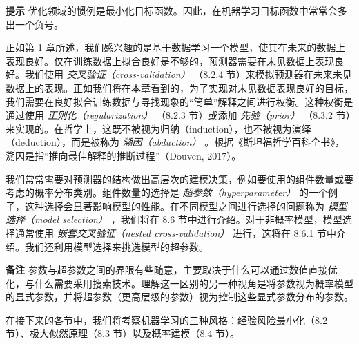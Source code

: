\begin{notebox}
\textbf{提示} 优化领域的惯例是最小化目标函数。因此，在机器学习目标函数中常常会多出一个负号。
\end{notebox}

正如第 1 章所述，我们感兴趣的是基于数据学习一个模型，使其在未来的数据上表现良好。仅在训练数据上拟合良好是不够的，预测器需要在未见数据上表现良好。我们使用 \emph{交叉验证（cross-validation）} （8.2.4 节）来模拟预测器在未来未见数据上的表现。正如我们将在本章看到的，为了实现对未见数据表现良好的目标，我们需要在良好拟合训练数据与寻找现象的“简单”解释之间进行权衡。这种权衡是通过使用 \emph{正则化（regularization）} （8.2.3 节）或添加 \emph{先验（prior）} （8.3.2 节）来实现的。在哲学上，这既不被视为归纳（induction），也不被视为演绎（deduction），而是被称为 \emph{溯因（abduction）} 。根据《斯坦福哲学百科全书》，溯因是指“推向最佳解释的推断过程”（Douven, 2017）。

我们常常需要对预测器的结构做出高层次的建模决策，例如要使用的组件数量或要考虑的概率分布类别。组件数量的选择是 \emph{超参数（hyperparameter）} 的一个例子，这种选择会显著影响模型的性能。在不同模型之间进行选择的问题称为 \emph{模型选择（model selection）} ，我们将在 8.6 节中进行介绍。对于非概率模型，模型选择通常使用 \emph{嵌套交叉验证（nested cross-validation）} 进行，这将在 8.6.1 节中介绍。我们还利用模型选择来挑选模型的超参数。

\begin{notebox}
\textbf{备注} 参数与超参数之间的界限有些随意，主要取决于什么可以通过数值直接优化，与什么需要采用搜索技术。理解这一区别的另一种视角是将参数视为概率模型的显式参数，并将超参数（更高层级的参数）视为控制这些显式参数分布的参数。
\end{notebox}

在接下来的各节中，我们将考察机器学习的三种风格：经验风险最小化（8.2 节）、极大似然原理（8.3 节）以及概率建模（8.4 节）。
